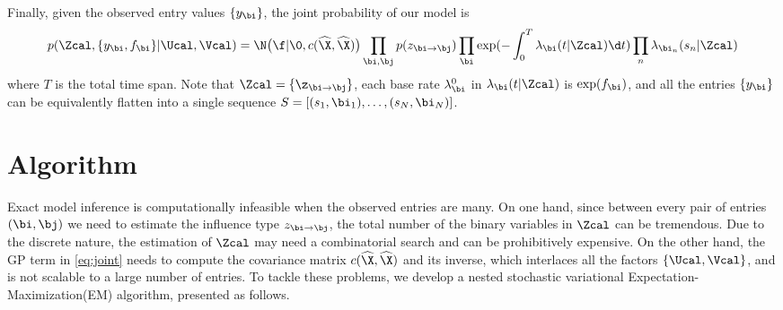 Finally, given the observed entry values $\{y_\bi\}$,  the joint probability of our model is 
\begin{align}
p(\Zcal, \{y_\bi, f_\bi\}|\Ucal, \Vcal) = \N\big(\f|\0, c(\widehat{\X}, \widehat{\X})\big)\prod_{\bi, \bj } p(z_{\bi\rightarrow \bj})\prod_{\bi}\exp(-\int_0^T \lambda_\bi(t|\Zcal)\d t) \prod_{n} \lambda_{\bi_n}(s_n|\Zcal) \label{eq:joint}
\end{align}
where $T$ is the total time span. Note that $\Zcal = \{\z_{\bi\rightarrow \bj}\}$, each base rate $\lambda_\bi^0$ in $\lambda_\bi(t|\Zcal)$ is $\exp(f_\bi)$, and all the entries $\{y_\bi\}$ can be  equivalently flatten into a single sequence $S = [(s_1, \bi_1), \ldots, (s_N, \bi_N)]$.

  
\section{Algorithm}
Exact model inference is computationally infeasible when the observed entries are many. On one hand, since between every pair of entries $(\bi, \bj)$ we need to estimate the influence type $z_{\bi \rightarrow \bj}$,  the total number of the binary variables in $\Zcal$ can be tremendous. Due to the discrete nature, the estimation of $\Zcal$ may need a combinatorial search and can be prohibitively expensive. On the other hand, the GP term in \eqref{eq:joint} needs to compute the covariance matrix $c(\widehat{\X}, \widehat{\X})$ and its inverse, which interlaces all the factors $\{\Ucal, \Vcal\}$, and is not scalable to a large number of entries. To tackle these problems, we develop a  nested stochastic variational Expectation-Maximization(EM) algorithm, presented as follows. %

